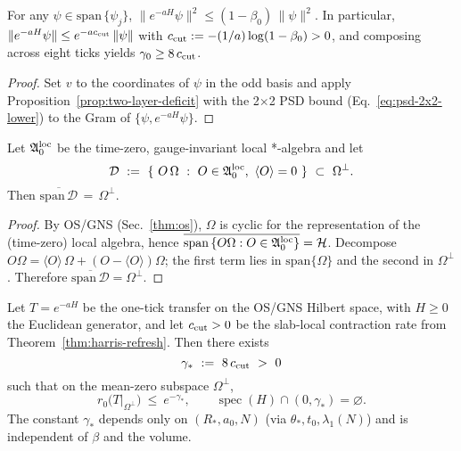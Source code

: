 \documentclass[11pt]{amsart}
\begin{document}
\begin{corollary}\label{cor:deficit-c-cut}
For any $\psi\in \mathrm{span}\,\{\psi_j\}$, $\|e^{-aH}\psi\|^2\le (1-\beta_0)\,\|\psi\|^2$. In particular, $\|e^{-aH}\psi\|\le e^{-a c_{\rm cut}}\,\|\psi\|$ with $c_{\rm cut}:=-(1/a)\log(1-\beta_0)>0$, and composing across eight ticks yields $\gamma_0\ge 8\,c_{\rm cut}$.
\end{corollary}

\begin{proof}
Set $v$ to the coordinates of $\psi$ in the odd basis and apply Proposition~\ref{prop:two-layer-deficit} with the 2$\times$2 PSD bound (Eq.~\eqref{eq:psd-2x2-lower}) to the Gram of $\{\psi,e^{-aH}\psi\}$.
\end{proof}

\medskip
\begin{lemma}\label{lem:local-span-dense}
Let $\mathfrak{A}_0^{\rm loc}$ be the time-zero, gauge-invariant local *-algebra and let
\[
  \mathcal D\ :=\ \{\ O\,\Omega\ :\ O\in \mathfrak{A}_0^{\rm loc},\ \langle O\rangle=0\ \}\ \subset\ \Omega^{\perp}.
\]
Then $\overline{\mathrm{span}\,\mathcal D}\,=\,\Omega^{\perp}$.
\end{lemma}

\begin{proof}
By OS/GNS (Sec.~\ref{thm:os}), $\Omega$ is cyclic for the representation of the (time-zero) local algebra, hence $\overline{\mathrm{span}\,\{O\Omega: O\in \mathfrak{A}_0^{\rm loc}\}}=\mathcal H$. Decompose $O\Omega=\langle O\rangle\,\Omega+(O-\langle O\rangle)\Omega$; the first term lies in $\mathrm{span}\{\Omega\}$ and the second in $\Omega^{\perp}$. Therefore $\overline{\mathrm{span}\,\mathcal D}=\Omega^{\perp}$.
\end{proof}

\begin{theorem}\label{thm:pf-gap-meanzero}
Let $T=e^{-aH}$ be the one-tick transfer on the OS/GNS Hilbert space, with $H\ge 0$ the Euclidean generator, and let $c_{\rm cut}>0$ be the slab-local contraction rate from Theorem~\ref{thm:harris-refresh}. Then there exists
\[
  \gamma_*\ :=\ 8\,c_{\rm cut}\ >\ 0
\]
such that on the mean-zero subspace $\Omega^{\perp}$,
\[
  r_0\bigl(T|_{\Omega^{\perp}}\bigr)\ \le\ e^{-\gamma_*},\qquad
  \operatorname{spec}(H)\cap(0,\gamma_*)=\varnothing.
\]
The constant $\gamma_*$ depends only on $(R_*,a_0,N)$ (via $\theta_*,t_0,\lambda_1(N)$) and is independent of $\beta$ and the volume.
\end{theorem}
\end{document}
